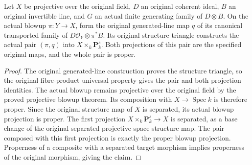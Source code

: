 \begin{lemma}
\label{lem:kn-nadel-nef-big-same-global-pair-proper}
\leanok
Let $X$ be projective over the original field, $D$ an original coherent
ideal, $B$ an original invertible line, and $G$ an actual finite
generating family of $D\otimes B$.  On the actual blowup $\pi:Y\to X$,
form the original generated-line map $q$ of its canonical transported
family of $D\mathcal O_Y\otimes\pi^*B$.  Its original structure triangle
constructs the actual pair $(\pi,q)$ into $X\times_k\mathbf P_k^s$.
Both projections of this pair are the specified original maps, and the
whole pair is proper.
\end{lemma}
\begin{proof}
The original generated-line construction proves the structure triangle,
so the original fibre-product universal property gives the pair and both
projection identities.  The actual blowup remains projective over the
original field by the proved projective blowup theorem.  Its composition
with $X\to\operatorname{Spec}k$ is therefore proper.  Since the original
structure map of $X$ is separated, its actual blowup projection is proper.
The first projection $X\times_k\mathbf P_k^s\to X$ is separated, as a
base change of the original separated projective-space structure map.
The pair composed with this first projection is exactly the proper
blowup projection.  Properness of a composite with a separated target
morphism implies properness of the original morphism, giving the claim.
\end{proof}

